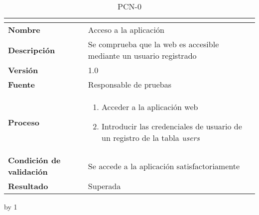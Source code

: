 \begin{table}[H]
	\caption{PCN-0\number\pcn}
	\begin{tabular}{|l|p{}|}
		\hline
		\multicolumn{2}{|c|}{\cellcolor[HTML]{BFBFBF}{\color[HTML]{000000} \textbf{PCN-0\number\pcn}}} \\ \hline
		\textbf{Nombre}                  & Acceso a la aplicación                                              \\ \hline
		\textbf{Descripción}             & Se comprueba que la web es accesible mediante un usuario registrado \\ \hline
		\textbf{Versión}                 & 1.0                                                                 \\ \hline
		\textbf{Fuente}                  & Responsable de pruebas                                              \\ \hline
		\textbf{Proceso}                 & \begin{enumerate}
			\item Acceder a la aplicación web
			\item Introducir las credenciales de usuario de un registro de la tabla \textit{users}
		\end{enumerate}                                          \\ \hline
		\textbf{Condición de validación} & Se accede a la aplicación satisfactoriamente                        \\ \hline
		\textbf{Resultado}               & Superada                                                            \\ \hline
	\end{tabular}
\end{table}
\advance\pcn by 1
